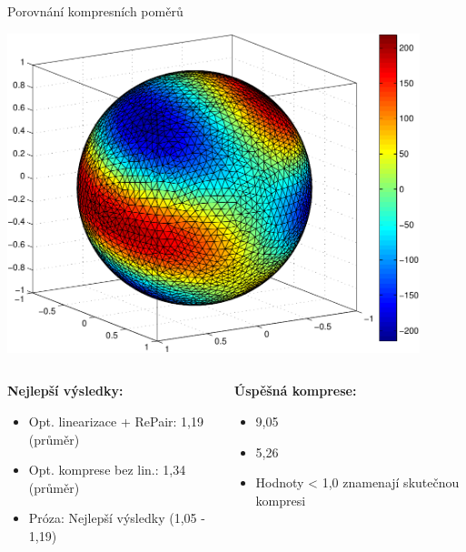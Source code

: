 \documentclass[lualatex,hyperref={pdfencoding=auto}]{beamer}
\begin{document}
\begin{frame}{Porovnání kompresních poměrů}
  \begin{center}
    \includegraphics[width=0.9\textwidth]{fig/sphere_mix_real.pdf}
  \end{center}
  \vspace{3mm}
  \begin{columns}
    \begin{column}{0.5\textwidth}
      \textbf{Nejlepší výsledky:}
      \begin{itemize}
        \item Opt. linearizace + RePair: 1,19 (průměr)
        \item Opt. komprese bez lin.: 1,34 (průměr)
        \item Próza: Nejlepší výsledky (1,05 - 1,19)
      \end{itemize}
    \end{column}
    \begin{column}{0.5\textwidth}
      \textbf{Úspěšná komprese:}
      \begin{itemize}
        \item 9,05%
        \item 5,26%
        \item Hodnoty < 1,0 znamenají skutečnou kompresi
      \end{itemize}
    \end{column}
  \end{columns}
\end{frame}
\end{document}
